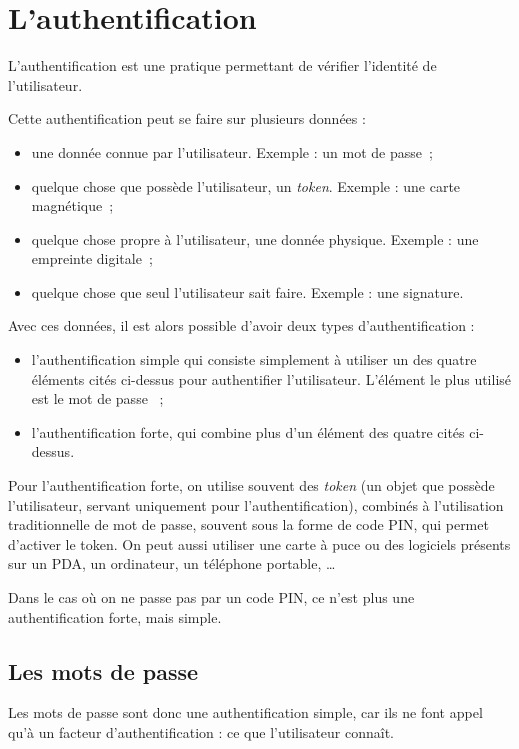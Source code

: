 \section{L'authentification\label{sec:Authentification}}
L'authentification est une pratique permettant de vérifier
l'identité de l'utilisateur.

Cette authentification peut se faire sur plusieurs données : 
\begin{itemize}
  \item une donnée connue par l'utilisateur. Exemple : un mot de
passe~;
  \item quelque chose que possède l'utilisateur, un \emph{token}.
Exemple : une carte magnétique~;
  \item quelque chose propre à l'utilisateur, une donnée physique.
Exemple : une empreinte digitale~;
  \item quelque chose que seul l'utilisateur sait faire. Exemple :
une signature.
\\
\end{itemize}

Avec ces données, il est alors possible d'avoir deux types
d'authentification : 
\begin{itemize}
  \item l'authentification simple qui consiste simplement à
utiliser un des quatre éléments cités ci-dessus pour authentifier
l'utilisateur. L'élément le plus utilisé est le mot de passe ~;
  \item l'authentification forte, qui combine plus d'un élément
des quatre cités ci-dessus.
\\
\end{itemize}

Pour l'authentification forte, on utilise souvent des
\emph{token} (un objet que possède l'utilisateur, servant
uniquement pour l'authentification), 
combinés à l'utilisation traditionnelle de mot de passe, souvent
sous la forme de code PIN, qui permet d'activer le token.
On peut aussi utiliser une carte à puce ou des logiciels présents
sur un PDA, un ordinateur, un téléphone portable, …

Dans le cas où on ne passe pas par un code PIN, ce n'est plus une
authentification forte, mais simple.

\subsection{Les mots de passe}
Les mots de passe sont donc une authentification simple, car ils
ne font appel qu'à un facteur d'authentification : ce que
l'utilisateur connaît. 

